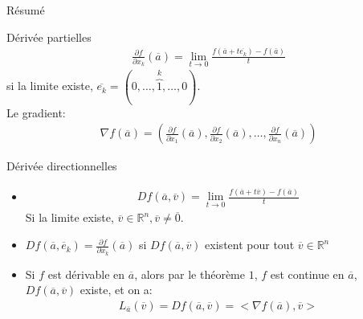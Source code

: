 \begin{parag}{Résumé}
\begin{subparag}{Dérivée partielles}
   \begin{align*}
       \frac{\partial f}{\partial x_k}( \overline{a}) = \lim_{t \to 0} \frac{f( \overline{a} + t \overline{e_k})- f( \overline{a}) }{t}
   \end{align*}
   si la limite existe, $ \overline{e_k} = (0, \dots, \overbrace{1}^{k}, \dots, 0)$.\\
   Le gradient:
   \begin{align*}
       \nabla f( \overline{a}) = \left( \frac{\partial f}{\partial x_1}( \overline{a}), \frac{\partial f}{\partial x_2}( \overline{a}), \dots, \frac{\partial f}{\partial x_n}( \overline{a}) \right)
   \end{align*}
\end{subparag}

\begin{subparag}{Dérivée directionnelles}
    \begin{itemize}
        \item \begin{align*}
        Df( \overline{a}, \overline{v}) = \lim_{t \to 0} \frac{f( \overline{a} + t \overline{v}) - f( \overline{a})}{t}
    \end{align*}
    Si la limite existe, $ \overline{v} \in \mathbb{R}^n , \overline{v} \neq \overline{0}$.
\item $Df( \overline{a}, \overline{e}_k) = \frac{\partial f}{\partial x_k}( \overline{a})$ si $Df( \overline{a}, \overline{v})$ existent pour tout $ \overline{v} \in \mathbb{R}^n $
    \item Si $f$ est dérivable en $\overline{a}$, alors par le théorème $1$, $f$ est continue en $\overline{a}$, $Df( \overline{a}, \overline{v})$ existe, et on a:
\begin{align*}
    L_{ \overline{a}} ( \overline{v}) = Df( \overline{a}, \overline{v}) = < \nabla f( \overline{a}), \overline{v}>
\end{align*}

    
    
    \end{itemize}
\end{subparag}
\end{parag}


